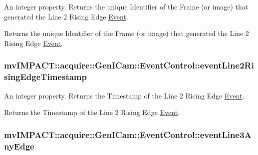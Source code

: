 An integer property. Returns the unique Identifier of the Frame (or image) that generated the Line 2 Rising Edge \hyperlink{classmv_i_m_p_a_c_t_1_1acquire_1_1_event}{Event}. 

Returns the unique Identifier of the Frame (or image) that generated the Line 2 Rising Edge \hyperlink{classmv_i_m_p_a_c_t_1_1acquire_1_1_event}{Event}. \hypertarget{classmv_i_m_p_a_c_t_1_1acquire_1_1_gen_i_cam_1_1_event_control_a7da4655fc3267b456dd1dbead508aedf}{
\subsubsection[{event\+Line2\+Rising\+Edge\+Timestamp}]{ mv\+I\+M\+P\+A\+C\+T\+::acquire\+::\+Gen\+I\+Cam\+::\+Event\+Control\+::event\+Line2\+Rising\+Edge\+Timestamp}}\label{classmv_i_m_p_a_c_t_1_1acquire_1_1_gen_i_cam_1_1_event_control_a7da4655fc3267b456dd1dbead508aedf}


An integer property. Returns the Timestamp of the Line 2 Rising Edge \hyperlink{classmv_i_m_p_a_c_t_1_1acquire_1_1_event}{Event}. 

Returns the Timestamp of the Line 2 Rising Edge \hyperlink{classmv_i_m_p_a_c_t_1_1acquire_1_1_event}{Event}. \hypertarget{classmv_i_m_p_a_c_t_1_1acquire_1_1_gen_i_cam_1_1_event_control_ab496218af7296bd79d84807ec1081509}{
\subsubsection[{event\+Line3\+Any\+Edge}]{ mv\+I\+M\+P\+A\+C\+T\+::acquire\+::\+Gen\+I\+Cam\+::\+Event\+Control\+::event\+Line3\+Any\+Edge}}\label{classmv_i_m_p_a_c_t_1_1acquire_1_1_gen_i_cam_1_1_event_control_ab496218af7296bd79d84807ec1081509}


